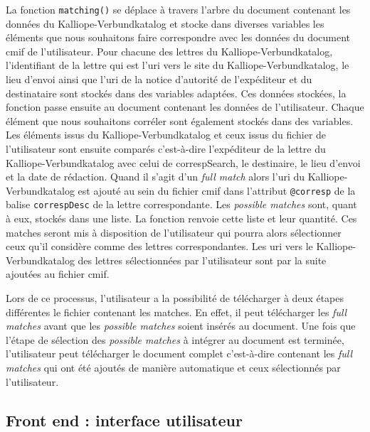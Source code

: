 \documentclass[a4paper, 12pt, twoside]{book}
\begin{document}
La fonction \texttt{matching()} se déplace à travers l'arbre du document contenant les données du Kalliope-Verbundkatalog et stocke dans diverses variables les éléments que nous souhaitons faire correspondre avec les données du document \gls{cmif} de l'utilisateur. Pour chacune des lettres du Kalliope-Verbundkatalog, l'identifiant de la lettre qui est l'\gls{uri} vers le site du Kalliope-Verbundkatalog, le lieu d'envoi ainsi que l'\gls{uri} de la notice d'autorité de l'expéditeur et du destinataire sont stockés dans des variables adaptées. Ces données stockées, la fonction passe ensuite au document contenant les données de l'utilisateur. Chaque élément que nous souhaitons corréler sont également stockés dans des variables. Les éléments issus du Kalliope-Verbundkatalog et ceux issus du fichier de l'utilisateur sont ensuite comparés c'est-à-dire l'expéditeur de la lettre du Kalliope-Verbundkatalog avec celui de correspSearch, le destinaire, le lieu d'envoi et la date de rédaction. Quand il s'agit d'un \textit{full match} alors l'\gls{uri} du Kalliope-Verbundkatalog est ajouté au sein du fichier \gls{cmif} dans l'attribut \texttt{@corresp} de la balise \texttt{correspDesc} de la lettre correspondante. Les \textit{possible matches} sont, quant à eux, stockés dans une liste. La fonction renvoie cette liste et leur quantité. Ces matches seront mis à disposition de l'utilisateur qui pourra alors sélectionner ceux qu'il considère comme des lettres correspondantes. Les \gls{uri} vers le Kalliope-Verbundkatalog des lettres sélectionnées par l'utilisateur sont par la suite ajoutées au fichier \gls{cmif}.

Lors de ce processus, l'utilisateur a la possibilité de télécharger à deux étapes différentes le fichier contenant les matches. En effet, il peut télécharger les \textit{full matches} avant que les \textit{possible matches} soient insérés au document. Une fois que l'étape de sélection des \textit{possible matches} à intégrer au document est terminée, l'utilisateur peut télécharger le document complet c'est-à-dire contenant les \textit{full matches} qui ont été ajoutés de manière automatique et ceux sélectionnés par l'utilisateur.

\subsection{Front end : interface utilisateur}
\end{document}
